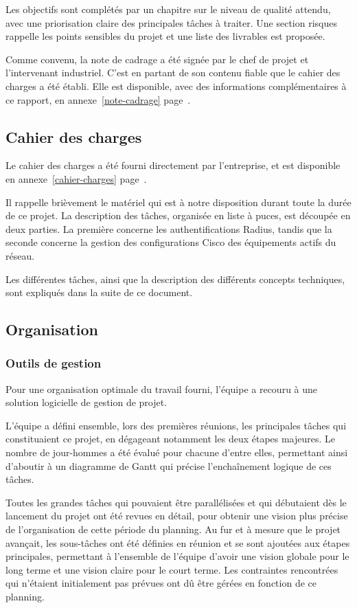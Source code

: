 Les objectifs sont complétés par un chapitre sur le niveau de qualité attendu, avec une priorisation claire des principales tâches à traiter. Une section risques rappelle les points sensibles du projet et une liste des livrables est proposée.

Comme convenu, la note de cadrage a été signée par le chef de projet et l'intervenant industriel. C'est en partant de son contenu fiable que le cahier des charges a été établi. Elle est disponible, avec des informations complémentaires à ce rapport, en annexe~\ref{note-cadrage} page~\pageref{note-cadrage}.

\subsection{Cahier des charges}

Le cahier des charges a été fourni directement par l'entreprise, et est disponible en annexe~\ref{cahier-charges} page~\pageref{cahier-charges}.

Il rappelle brièvement le matériel qui est à notre disposition durant toute la durée de ce projet. La description des tâches, organisée en liste à puces, est découpée en deux parties. La première concerne les authentifications Radius, tandis que la seconde concerne la gestion des configurations Cisco des équipements actifs du réseau.

Les différentes tâches, ainsi que la description des différents concepts techniques, sont expliqués dans la suite de ce document.

\subsection{Organisation}
\subsubsection{Outils de gestion}

Pour une organisation optimale du travail fourni, l'équipe a recouru à une solution logicielle de gestion de projet.

L'équipe a défini ensemble, lors des premières réunions, les principales tâches qui constituaient ce projet, en dégageant notamment les deux étapes majeures. Le nombre de jour-hommes a été évalué pour chacune d'entre elles, permettant ainsi d'aboutir à un diagramme de Gantt qui précise l'enchaînement logique de ces tâches.

Toutes les grandes tâches qui pouvaient être parallélisées et qui débutaient dès le lancement du projet ont été revues en détail, pour obtenir une vision plus précise de l'organisation de cette période du planning. Au fur et à mesure que le projet avançait, les sous-tâches ont été définies en réunion et se sont ajoutées aux étapes principales, permettant à l'ensemble de l'équipe d'avoir une vision globale pour le long terme et une vision claire pour le court terme. Les contraintes rencontrées qui n'étaient initialement pas prévues ont dû être gérées en fonction de ce planning.


